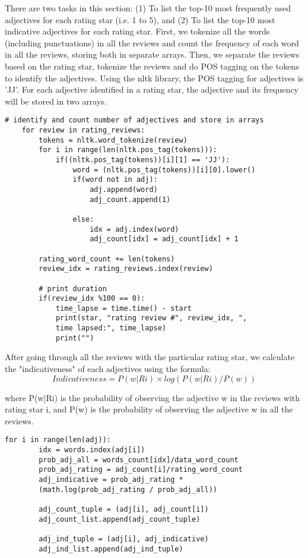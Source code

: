 There are two tasks in this section: (1) To list the top-10 most frequently used adjectives for each rating star (i.e. 1 to 5), and (2) To list the top-10 most indicative adjectives for each rating star. First, we tokenize all the words (including punctuations) in all the reviews and count the frequency of each word in all the reviews, storing both in separate arrays. Then, we separate the reviews based on the rating star, tokenize the reviews and do POS tagging on the tokens to identify the adjectives. Using the nltk library, the POS tagging for adjectives is 'JJ'. For each adjective identified in a rating star, the adjective and its frequency will be stored in two arrays. 

\begin{Verbatim}[fontsize=\tiny]
    # identify and count number of adjectives and store in arrays
    for review in rating_reviews:
        tokens = nltk.word_tokenize(review)
        for i in range(len(nltk.pos_tag(tokens))):
            if((nltk.pos_tag(tokens))[i][1] == 'JJ'):
                word = (nltk.pos_tag(tokens))[i][0].lower()
                if(word not in adj):
                    adj.append(word)
                    adj_count.append(1)
                
                else:
                    idx = adj.index(word)
                    adj_count[idx] = adj_count[idx] + 1

        rating_word_count += len(tokens)
        review_idx = rating_reviews.index(review)
        
        # print duration
        if(review_idx %100 == 0):
            time_lapse = time.time() - start
            print(star, "rating review #", review_idx, ", 
            time lapsed:", time_lapse)
            print("")
\end{Verbatim}

After going through all the reviews with the particular rating star, we calculate the "indicativeness" of each adjectives using the formula:
    \begin{equation}
        Indicativeness = P(w|Ri)×log(P(w|Ri)/P(w))
    \end{equation}
    
    where P(w|Ri) is the probability of observing the adjective w in the reviews with rating star i, and P(w) is the probability of observing the adjective w in all the reviews.

\begin{Verbatim}[fontsize=\tiny]
    for i in range(len(adj)):
        idx = words.index(adj[i])
        prob_adj_all = words_count[idx]/data_word_count
        prob_adj_rating = adj_count[i]/rating_word_count
        adj_indicative = prob_adj_rating * 
        (math.log(prob_adj_rating / prob_adj_all))
    
        adj_count_tuple = (adj[i], adj_count[i])
        adj_count_list.append(adj_count_tuple)
    
        adj_ind_tuple = (adj[i], adj_indicative)
        adj_ind_list.append(adj_ind_tuple)
\end{Verbatim}

